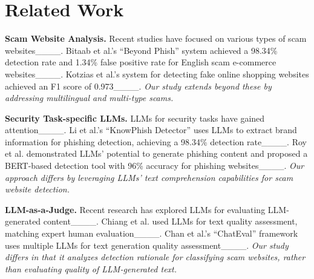 \section{Related Work}
\noindent\textbf{Scam Website Analysis.}
Recent studies have focused on various types of scam websites____.
Bitaab et al.'s ``Beyond Phish'' system achieved a 98.34\% detection rate and 1.34\% false positive rate for English scam e-commerce websites____.
Kotzias et al.'s system for detecting fake online shopping websites achieved an F1 score of 0.973____.
\textit{Our study extends beyond these by addressing multilingual and multi-type scams.}

\noindent\textbf{Security Task-specific LLMs.}
LLMs for security tasks have gained attention____.
Li et al.'s ``KnowPhish Detector'' uses LLMs to extract brand information for phishing detection, achieving a 98.34\% detection rate____.
Roy et al. demonstrated LLMs' potential to generate phishing content and proposed a BERT-based detection tool with 96\% accuracy for phishing websites____.
\textit{Our approach differs by leveraging LLMs' text comprehension capabilities for scam website detection.}

\noindent\textbf{LLM-as-a-Judge.}
Recent research has explored LLMs for evaluating LLM-generated content____.
Chiang et al. used LLMs for text quality assessment, matching expert human evaluation____.
Chan et al.'s ``ChatEval'' framework uses multiple LLMs for text generation quality assessment____.
\textit{Our study differs in that it analyzes detection rationale for classifying scam websites, rather than evaluating quality of LLM-generated text.}